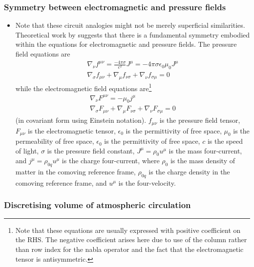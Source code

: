 \subsubsection{Symmetry between electromagnetic and pressure fields}

\begin{itemize}
	\item Note that these circuit analogies might not be merely superficial similarities. Theoretical work by \citet{fedosin2015} suggests that there is a fundamental symmetry embodied within the equations for electromagnetic and pressure fields. The pressure field equations are \citep{fedosin2015}
	\begin{eqnarray}
		\nabla_\nu f^{\mu \nu} = \frac{- 4 \pi \sigma}{c^2} J^\mu = -4 \pi \sigma \epsilon_0 \mu_0 J^\mu \\
		\nabla_\sigma f_{\mu \nu} + \nabla_\mu f_{\nu \sigma} + \nabla_\nu f_{\sigma \mu} = 0
	\end{eqnarray}
	while the electromagnetic field equations are\footnote{Note that these equations are usually expressed with positive coefficient on the RHS. The negative coefficient arises here due to use of the column rather than row index for the nabla operator and the fact that the electromagnetic tensor is antisymmetric.}
	\begin{eqnarray}
		\nabla_\nu F^{\mu \nu} = - \mu_0 j^\mu \\
		\nabla_\sigma F_{\mu \nu} + \nabla_\mu F_{\nu \sigma} + \nabla_\nu F_{\sigma \mu} = 0
	\end{eqnarray}
	(in covariant form using Einstein notation). $f_{\mu \nu}$ is the pressure field tensor, $F_{\mu \nu}$ is the electromagnetic tensor, $\epsilon_0$ is the permittivity of free space, $\mu_0$ is the permeability of free space, $\epsilon_0$ is the permittivity of free space, $c$ is the speed of light, $\sigma$ is the pressure field constant, $J^\mu = \rho_0 u^\mu$ is the mass four-current, and $j^\mu = \rho_{0q} u^\mu$ is the charge four-current, where $\rho_0$ is the mass density of matter in the comoving reference frame, $\rho_{0q}$ is the charge density in the comoving reference frame, and $u^\mu$ is the four-velocity.
\end{itemize}

\subsubsection{Discretising volume of atmospheric circulation}

